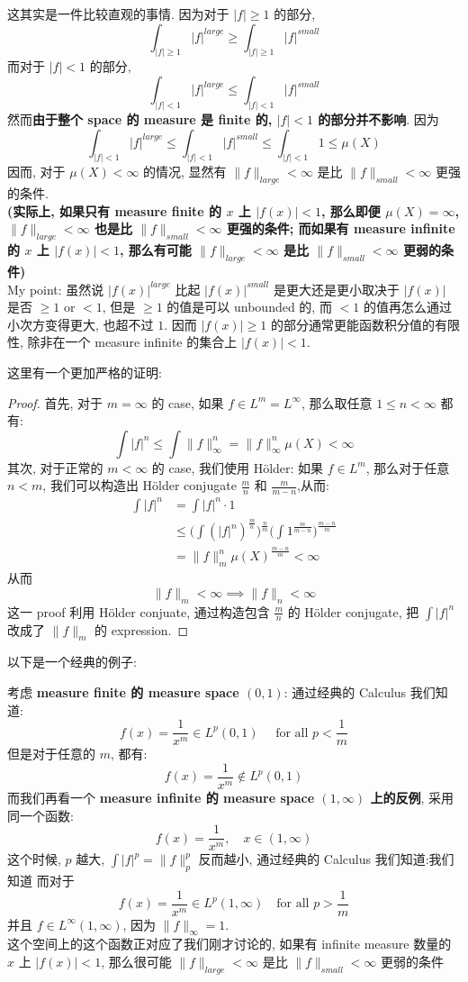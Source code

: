 \documentclass[lang=cn,11pt]{elegantbook}
\begin{document}
这其实是一件比较直观的事情. 因为对于 $|f| \geq 1$ 的部分, 
\[
\int_{|f| \geq 1} |f|^{large} \geq \int_{|f| \geq 1}  |f|^{small}
\]
而对于 $|f| <1$ 的部分,\[
\int_{|f| < 1} |f|^{large} \leq \int_{|f|< 1}  |f|^{small}
\]
然而\textbf{由于整个 space 的 measure 是 finite 的, $|f| <1$ 的部分并不影响}. 因为 \[
\int_{|f| < 1} |f|^{large} \leq \int_{|f|< 1}  |f|^{small} \leq \int_{|f|< 1}  1 \leq \mu(X)
\]
因而, 对于 $\mu(X)<\infty$ 的情况, 显然有 $\|f\|_{large}< \infty$ 是比 $\|f\|_{small}<\infty$ 更强的条件.\\

\textbf{(实际上, 如果只有 measure finite 的 $x$ 上 $|f(x)| < 1$, 那么即便 $\mu(X)=\infty$, $\|f\|_{large}< \infty$ 也是比 $\|f\|_{small}<\infty$ 更强的条件; 而如果有 measure infinite 的 $x$ 上 $|f(x)| <1$, 那么有可能 $\|f\|_{large}< \infty$ 是比 $\|f\|_{small}<\infty$ 更弱的条件)}\\
My point: 虽然说 $|f(x)|^{large}$ 比起 $|f(x)|^{small}$ 是更大还是更小取决于 $|f(x)|$ 是否 $\geq 1$ or $<1$, 但是 $\geq 1$ 的值是可以 unbounded 的, 而 $<1$ 的值再怎么通过小次方变得更大, 也超不过 $1$. 因而 $|f(x)| \geq 1$ 的部分通常更能函数积分值的有限性, 除非在一个 measure infinite 的集合上 $|f(x)| <1$.

这里有一个更加严格的证明:
\begin{proof}
首先, 对于 $m = \infty$ 的 case, 如果 $f\in L^{m} = L^{\infty}$, 那么取任意 $1\leq n < \infty$ 都有: \[
\int |f|^n \leq \int \|f\|_\infty^n = \|f\|_\infty ^ n  \mu(X) < \infty
\]
 其次, 对于正常的  $m < \infty$ 的 case, 我们使用 Hölder: 
如果 $f\in L^m$, 那么对于任意 $n<m$, 我们可以构造出 Hölder conjugate $\frac{m}{n}$ 和 $\frac{m}{m-n}$,从而:
\begin{align*}
      \int |f|^n &= \int |f|^n \cdot 1 \\
      &\leq \bigg(  \int (|f|^n)^{\frac{m}{n}}  \bigg)^{\frac{n}{m}}\bigg(  \int 1^{\frac{m}{m-n}}  \bigg)^{\frac{m-n}{m}}\\
      & = \|f\|_m^n \mu(X)^{\frac{m-n}{m}} < \infty 
 \end{align*}
 从而 $$\| f\|_m <\infty \implies \|f \|_n < \infty$$
 这一 proof 利用 Hölder conjuate, 通过构造包含 $\frac{m}{n}$ 的 Hölder conjugate, 把 $ \int |f|^n$ 改成了 $ \|f\|_m$ 的 expression.
\end{proof}
以下是一个经典的例子:
\begin{example}
考虑\textbf{ measure finite 的 measure space $(0,1)$}: 通过经典的 Calculus 我们知道:
\[ f(x) = \frac{1}{x^m} \in L^p(0,1) \quad \text{ for all } p < \frac{1}{m}\]
但是对于任意的 $m$, 都有: \[
 f(x) = \frac{1}{x^m} \not\in L^p(0,1)
\]
而我们再看一个 \textbf{measure infinite 的 measure space $(1,\infty)$ 上的反例}, 采用同一个函数:
$$f(x) = \frac{1}{x^m},\quad x\in (1,\infty)$$
这个时候, $p$ 越大, $\int |f|^p =  \|f \|_p^p$ 反而越小, 通过经典的 Calculus 我们知道:我们知道
而对于 \[
f(x) = \frac{1}{x^m} \in L^p(1,\infty)\quad \text{for all } p > \frac{1}{m}
\]并且 $f \in L^\infty (1,\infty)$, 因为 $\|f\|_\infty  = 1$.\\
这个空间上的这个函数正对应了我们刚才讨论的, 如果有 infinite measure 数量的 $x$ 上 $|f(x)| <1$, 那么很可能 $\|f\|_{large}< \infty$ 是比 $\|f\|_{small}<\infty$ 更弱的条件
\end{example}
\end{document}
